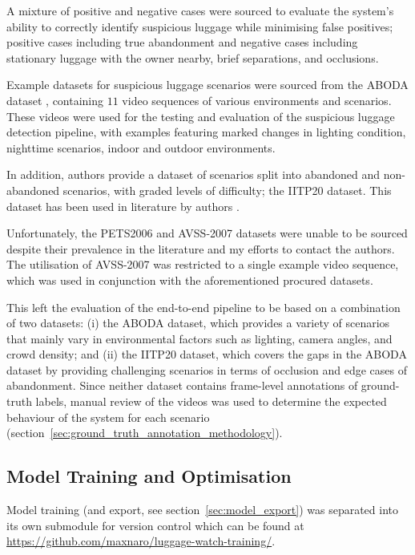 A mixture of positive and negative cases were sourced to evaluate the system's
ability to correctly identify suspicious luggage while minimising false
positives; positive cases including true abandonment and negative cases
including stationary luggage with the owner nearby, brief separations, and
occlusions.

Example datasets for suspicious luggage scenarios were sourced from the ABODA
dataset \citep{lin2015aboda}, containing $11$ video sequences of various
environments and scenarios. These videos were used for the testing and
evaluation of the suspicious luggage detection pipeline, with examples
featuring marked changes in lighting condition, nighttime scenarios, indoor and
outdoor environments.

In addition, authors \citet{amin2021large} provide a dataset of scenarios split
into abandoned and non-abandoned scenarios, with graded levels of difficulty;
the IITP20 dataset. This dataset has been used in literature by authors
\citet{abandoned2025vrsalovic}.

Unfortunately, the PETS2006 \citep{thirde2006pets} and AVSS-2007
\citep{qmul2007avss} datasets were unable to be sourced despite their
prevalence in the literature and my efforts to contact the authors. The
utilisation of AVSS-2007 was restricted to a single example video sequence,
which was used in conjunction with the aforementioned procured datasets.

This left the evaluation of the end-to-end pipeline to be based on a
combination of two datasets: (i) the ABODA dataset, which provides a variety of
scenarios that mainly vary in environmental factors such as lighting, camera
angles, and crowd density; and (ii) the IITP20 dataset, which covers the gaps
in the ABODA dataset by providing challenging scenarios in terms of occlusion
and edge cases of abandonment. Since neither dataset contains frame-level
annotations of ground-truth labels, manual review of the videos was used to
determine the expected behaviour of the system for each scenario
(section~\ref{sec:ground_truth_annotation_methodology}).
\subsection{Model Training and Optimisation}
\label{sec:model_training_optimisation}

Model training (and export, see section~\ref{sec:model_export}) was separated
into its own submodule for version control which can be found at
\url{https://github.com/maxnaro/luggage-watch-training/}.

